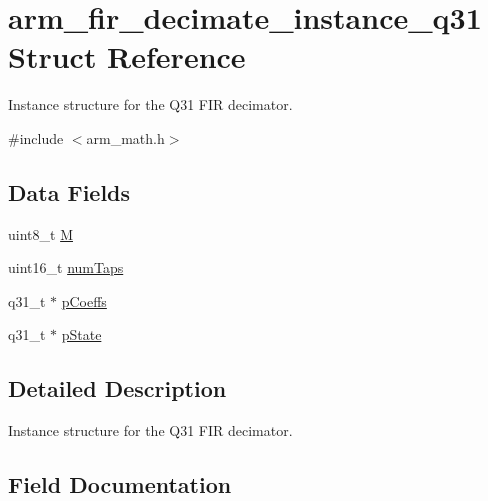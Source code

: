 \hypertarget{structarm__fir__decimate__instance__q31}{}\section{arm\+\_\+fir\+\_\+decimate\+\_\+instance\+\_\+q31 Struct Reference}
\label{structarm__fir__decimate__instance__q31}


Instance structure for the Q31 F\+IR decimator.  




{\ttfamily \#include $<$arm\+\_\+math.\+h$>$}

\subsection*{Data Fields}
\begin{DoxyCompactItemize}
\item 
uint8\+\_\+t \mbox{\hyperlink{structarm__fir__decimate__instance__q31_ae2c8107d00d3c9942e7a20fc598edecf}{M}}
\item 
uint16\+\_\+t \mbox{\hyperlink{structarm__fir__decimate__instance__q31_a751941891e47f522a7f5375fe8990aac}{num\+Taps}}
\item 
q31\+\_\+t $\ast$ \mbox{\hyperlink{structarm__fir__decimate__instance__q31_a68888e36167d81cb7836db10367a1682}{p\+Coeffs}}
\item 
q31\+\_\+t $\ast$ \mbox{\hyperlink{structarm__fir__decimate__instance__q31_adee4ba3ee8869865af7d8fa08ca913d6}{p\+State}}
\end{DoxyCompactItemize}


\subsection{Detailed Description}
Instance structure for the Q31 F\+IR decimator. 

\subsection{Field Documentation}
\mbox{\label{structarm__fir__decimate__instance__q31_ae2c8107d00d3c9942e7a20fc598edecf}} 
